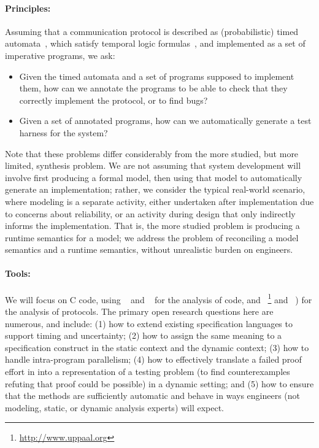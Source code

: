 \paragraph{Principles:} Assuming that a communication protocol is described
as (probabilistic) timed automata~\cite{AD1994:TCS},
which satisfy temporal logic
formulas~\cite{BLM2017:LNCS}, and implemented as a set of
imperative programs, we ask:
\begin{itemize}[labelsep=3pt,leftmargin=12pt]
\item Given the timed automata and a set of programs supposed to
  implement them, how can we annotate the programs to be able to check
  that they correctly implement the protocol, or to find bugs?
\item Given a set of annotated programs, how can we automatically
  generate a test harness for the system?
\end{itemize}

Note that these problems differ considerably from the more studied,
but more limited, synthesis problem.  We are not assuming that
system development will involve first producing a formal model, then
using that model to automatically generate an implementation; rather,
we consider the typical real-world scenario, where modeling is a
separate activity, either undertaken after implementation due to
concerns about reliability, or an activity during design that only
indirectly informs the implementation.  That is, the more studied
problem is producing a runtime semantics for a model; we address the
problem of reconciling a model semantics and a runtime semantics,
without unrealistic burden on engineers.


\paragraph{Tools:} We will focus on C code, using \framac~\cite{KKP2015:FAC} and \deepstate~\cite{DeepState}
for the analysis of code, and
\uppaal~\footnote{\url{http://www.uppaal.org}} and
\prism~\cite{KNP2011:CAV}) for the analysis of protocols.  The primary open research questions here are numerous, and include:
(1) how to extend existing specification languages to support timing and uncertainty;
(2) how to assign the same meaning to a specification construct in
  the static \framac context and the dynamic \deepstate context;
(3) how to handle intra-program parallelism;
(4) how to effectively translate a failed proof effort in \framac
  into a representation of a testing problem (to find counterexamples
  refuting that proof could be possible) in a dynamic setting; and
(5) how to ensure that the methods are sufficiently automatic
  and behave in ways engineers (not modeling, static, or dynamic
  analysis experts) will expect.

